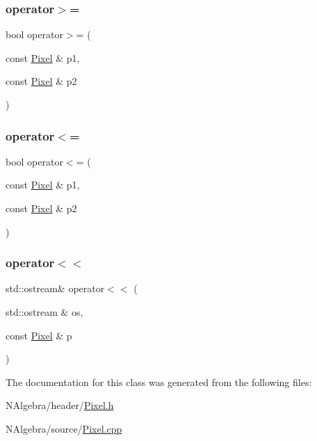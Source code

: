 \mbox{\label{class_pixel_a9564c5098775053d65c9f052b9281388}} 
\subsubsection{\texorpdfstring{operator$>$=}{operator>=}}
{\footnotesize\ttfamily bool operator$>$= (\begin{DoxyParamCaption}\item[{const \mbox{\hyperlink{class_pixel}{Pixel}} \&}]{p1,  }\item[{const \mbox{\hyperlink{class_pixel}{Pixel}} \&}]{p2 }\end{DoxyParamCaption})\hspace{0.3cm}{\ttfamily [friend]}}

\mbox{\label{class_pixel_a8e1356c4b2066282783d0c03526bd34f}} 
\subsubsection{\texorpdfstring{operator$<$=}{operator<=}}
{\footnotesize\ttfamily bool operator$<$= (\begin{DoxyParamCaption}\item[{const \mbox{\hyperlink{class_pixel}{Pixel}} \&}]{p1,  }\item[{const \mbox{\hyperlink{class_pixel}{Pixel}} \&}]{p2 }\end{DoxyParamCaption})\hspace{0.3cm}{\ttfamily [friend]}}

\mbox{\label{class_pixel_af9850b2e5c78fc7f7e841c490713168e}} 
\subsubsection{\texorpdfstring{operator$<$$<$}{operator<<}}
{\footnotesize\ttfamily std\+::ostream\& operator$<$$<$ (\begin{DoxyParamCaption}\item[{std\+::ostream \&}]{os,  }\item[{const \mbox{\hyperlink{class_pixel}{Pixel}} \&}]{p }\end{DoxyParamCaption})\hspace{0.3cm}{\ttfamily [friend]}}



The documentation for this class was generated from the following files\+:\begin{DoxyCompactItemize}
\item 
N\+Algebra/header/\mbox{\hyperlink{_pixel_8h}{Pixel.\+h}}\item 
N\+Algebra/source/\mbox{\hyperlink{_pixel_8cpp}{Pixel.\+cpp}}\end{DoxyCompactItemize}
